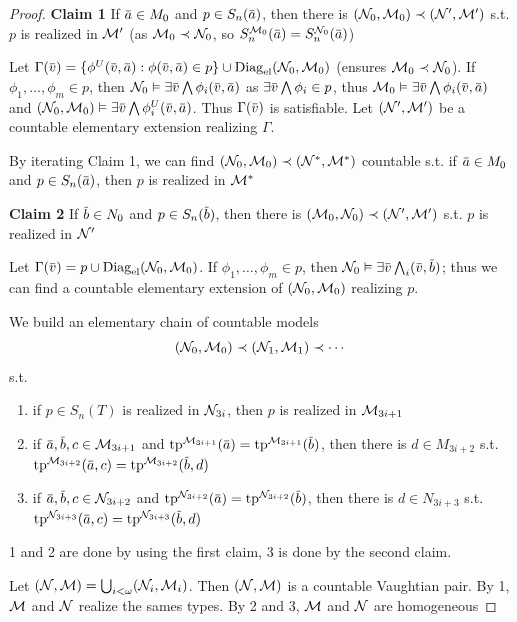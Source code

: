 \documentclass[11pt]{article}
\begin{document}
\begin{proof}
\textbf{Claim 1} If \(\bara\in M_0\) and \(p\in S_n(\bara)\), then there is \((\mathcal{N}_0,\mathcal{M}_0)\prec(\mathcal{N}',\mathcal{M}')\) s.t. \(p\) is
realized in \(\mathcal{M}'\) (as \(\mathcal{M}_0\prec\mathcal{N}_0\), so \(S_n^{\calm_0}(\bara)=S_n^{\caln_0}(\bara)\))

Let \(\Gamma(\barv)=\{\phi^U(\barv,\bara):\phi(\barv,\bara)\in p\}\cup\Diag_{\el}(\caln_0,\calm_0)\) (ensures \(\mathcal{M}_0\prec\mathcal{N}_0\)). If \(\phi_1,\dots,\phi_m\in p\),
then \(\caln_0\vDash\exists\barv\bigwedge\phi_i(\barv,\bara)\) as \(\exists\barv\bigwedge\phi_i\in p\), thus \(\calm_0\vDash\exists\barv\bigwedge\phi_i(\barv,\bara)\)
and \((\caln_0,\calm_0)\vDash\exists\barv\bigwedge\phi_i^U(\barv,\bara)\). Thus \(\Gamma(\barv)\) is satisfiable. Let \((\mathcal{N}',\mathcal{M}')\) be
a countable elementary extension realizing \(\Gamma\).

By iterating Claim 1, we can find \((\mathcal{N}_0,\mathcal{M}_0)\prec(\mathcal{N}^*,\mathcal{M}^*)\) countable s.t. if \(\bara\in M_0\)
and \(p\in S_n(\bara)\), then \(p\) is realized in \(\mathcal{M}^*\)

\textbf{Claim 2} If \(\barb\in N_0\) and \(p\in S_n(\barb)\), then there is \((\mathcal{M}_0,\mathcal{N}_0)\prec(\mathcal{N}',\mathcal{M}')\) s.t. \(p\)
is realized in \(\mathcal{N}'\)

Let \(\Gamma(\barv)=p\cup\Diag_{\el}(\caln_0,\calm_0)\). If \(\phi_1,\dots,\phi_m\in p\), then \(\caln_0\vDash\exists\barv\bigwedge_i(\barv,\barb)\);
thus we can find a countable elementary extension of \((\mathcal{N}_0,\mathcal{M}_0)\) realizing \(p\).

We build an elementary chain of countable models
\begin{equation*}
(\mathcal{N}_0,\mathcal{M}_0)\prec(\mathcal{N}_1,\mathcal{M}_1)\prec\cdots
\end{equation*}
s.t.
\begin{enumerate}
\item if \(p\in S_n(T)\) is realized in \(\mathcal{N}_{3i}\), then \(p\) is realized in \(\mathcal{M}_{3i+1}\)
\item if \(\bara,\barb,c\in\calm_{3i+1}\) and \(\tp^{\calm_{3i+1}}(\bara)=\tp^{\calm_{3i+1}}(\barb)\), then there
is \(d\in M_{3i+2}\) s.t. \(\tp^{\calm_{3i+2}}(\bara,c)=\tp^{\calm_{3i+2}}(\barb,d)\)
\item if \(\bara,\barb,c\in\caln_{3i+2}\) and \(\tp^{\caln_{3i+2}}(\bara)=\tp^{\caln_{3i+2}}(\barb)\), then there
is \(d\in N_{3i+3}\) s.t. \(\tp^{\caln_{3i+3}}(\bara,c)=\tp^{\caln_{3i+3}}(\barb,d)\)
\end{enumerate}


1 and 2 are done by using the first claim, 3 is done by the second claim.

Let \((\mathcal{N},\mathcal{M})=\bigcup_{i<\omega}(\mathcal{N}_i,\mathcal{M}_i)\). Then \((\mathcal{N},\mathcal{M})\) is a countable Vaughtian pair. By 1, \(\mathcal{M}\)
and \(\mathcal{N}\) realize the sames types. By 2 and 3, \(\mathcal{M}\) and \(\mathcal{N}\) are homogeneous
\end{proof}
\end{document}
